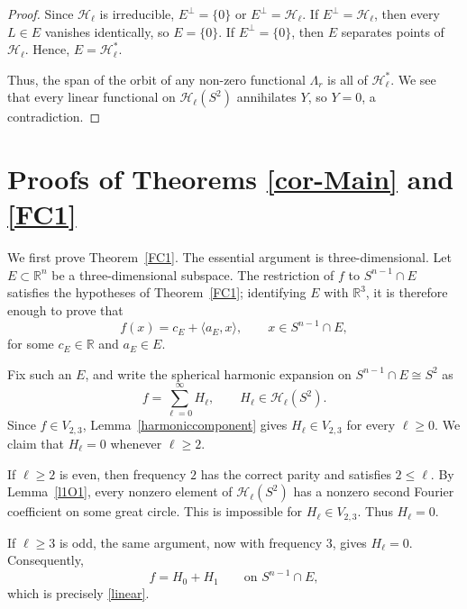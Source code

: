 \documentclass[11pt]{article}
\theoremstyle{definition}
\begin{document}
\begin{proof}
	Since $\mathcal H_\ell$ is irreducible, $E^{\perp}=\{0\}$ or $E^{\perp}=\mathcal H_\ell$. If 
	$E^{\perp}=\mathcal H_\ell$, then every $L\in E$ vanishes identically, so $E=\{0\}$.
	If 
	$E^{\perp}=\{0\}$, then  $E$ separates points of $\mathcal H_\ell$. Hence, $E=\mathcal H_\ell^*$.
	
	Thus, the span of the orbit of any non-zero functional $\Lambda_r$ is all of $\mathcal H_\ell^*$. We see that every linear functional on $\mathcal H_\ell(S^2)$ annihilates $Y$, so $Y=0$, a contradiction.
\end{proof}












\section{Proofs of Theorems \ref{cor-Main} and \ref{FC1}}

We first prove Theorem~\ref{FC1}. The essential argument is three-dimensional.
Let \(E\subset\mathbb R^n\) be a three-dimensional subspace. The restriction of \(f\)
to \(S^{n-1}\cap E\) satisfies the hypotheses of Theorem~\ref{FC1}; identifying \(E\)
with \(\mathbb R^3\), it is therefore enough to prove that
\begin{equation}\label{linear}
f(x)=c_E+\langle a_E,x\rangle,
\qquad x\in S^{n-1}\cap E,
\end{equation}
for some \(c_E\in\mathbb R\) and \(a_E\in E\).

Fix such an \(E\), and write the spherical harmonic expansion on \(S^{n-1}\cap E\cong
S^2\) as
\[
f=\sum_{\ell=0}^{\infty}H_\ell,
\qquad H_\ell\in\mathcal H_\ell(S^2).
\]
Since \(f\in V_{2,3}\), Lemma~\ref{harmoniccomponent} gives
\(H_\ell\in V_{2,3}\) for every \(\ell\ge0\). We claim that \(H_\ell=0\) whenever
\(\ell\ge2\).

If \(\ell\ge2\) is even, then frequency \(2\) has the correct parity and satisfies
\(2\le\ell\). By Lemma~\ref{l1O1}, every nonzero element of
\(\mathcal H_\ell(S^2)\) has a nonzero second Fourier coefficient on some great circle.
This is impossible for \(H_\ell\in V_{2,3}\). Thus \(H_\ell=0\).

If \(\ell\ge3\) is odd, the same argument, now with frequency \(3\), gives
\(H_\ell=0\). Consequently,
\[
f=H_0+H_1
\qquad\text{on }S^{n-1}\cap E,
\]
which is precisely \eqref{linear}.
\end{document}
